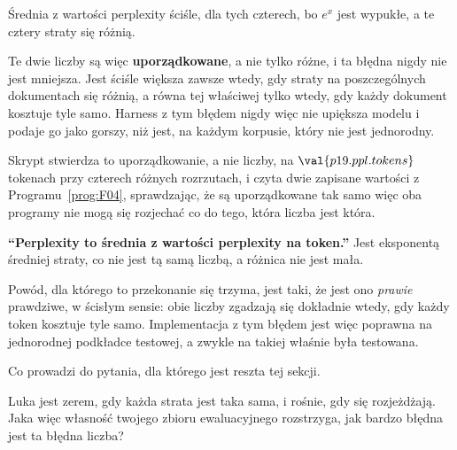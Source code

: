 \begin{fr}
\begin{ansblock}
Średnia z wartości perplexity \dash{} ściśle, dla tych czterech, bo $e^{x}$
jest wypukłe, a te cztery straty się różnią.
\end{ansblock}

Te dwie liczby są więc \textbf{uporządkowane}, a nie tylko różne, i ta błędna
nigdy nie jest mniejsza. Jest ściśle większa zawsze wtedy, gdy straty na
poszczególnych dokumentach się różnią, a równa tej właściwej tylko wtedy, gdy
każdy dokument kosztuje tyle samo. Harness z tym błędem nigdy więc nie
upiększa modelu i podaje go jako gorszy, niż jest, na każdym korpusie, który
nie jest jednorodny.

Skrypt stwierdza to uporządkowanie, a nie liczby, na
$\val{p19.ppl.tokens}$ tokenach przy czterech różnych rozrzutach, i czyta dwie
zapisane wartości z Programu~\ref{prog:F04}, sprawdzając, że są uporządkowane
tak samo \dash{} więc oba programy nie mogą się rozjechać co do tego, która
liczba jest która.
\end{fr}

\begin{fr}
\begin{trapbox}
\textbf{\enquote{Perplexity to średnia z wartości perplexity na token.}}
Jest eksponentą średniej straty, co nie jest tą samą liczbą, a różnica nie
jest mała.

Powód, dla którego to przekonanie się trzyma, jest taki, że jest ono
\emph{prawie} prawdziwe, w ścisłym sensie: obie liczby zgadzają się dokładnie
wtedy, gdy każdy token kosztuje tyle samo. Implementacja z tym błędem jest
więc poprawna na jednorodnej podkładce testowej, a zwykle na takiej właśnie
była testowana.
\end{trapbox}
\end{fr}

\begin{fr}
Co prowadzi do pytania, dla którego jest reszta tej sekcji.

Luka jest zerem, gdy każda strata jest taka sama, i rośnie, gdy się
rozjeżdżają. Jaka więc własność twojego zbioru ewaluacyjnego rozstrzyga, jak
bardzo błędna jest ta błędna liczba?
\nextframe
\end{fr}

